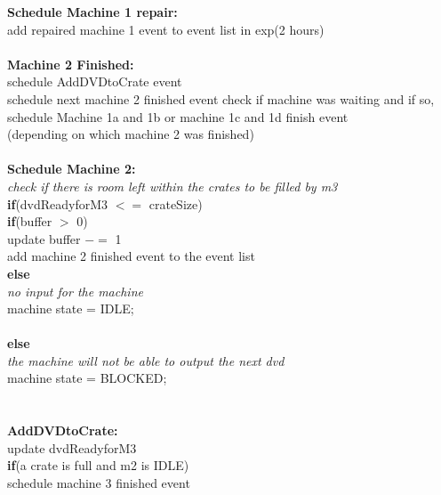 \documentclass[11pt,a4paper]{article}
\newcommand{\tab}{\hspace*{2em}}
\begin{document}
\noindent \textbf{Schedule Machine 1 repair:} \textbraceleft  \\
	\tab add repaired machine 1 event to event list in exp(2 hours) \\
\textbraceright \\

\noindent \textbf{Machine 2 Finished:} \textbraceleft\\ 
	\tab schedule AddDVDtoCrate event \\
	\tab schedule next machine 2 finished event
	\tab check if machine was waiting and if so,
	\tab	schedule Machine 1a and 1b or machine 1c and 1d finish event \\
	\tab	(depending on which machine 2 was finished) \\
\textbraceright \\

\noindent \textbf{Schedule Machine 2:} \textbraceleft\\ 
	\tab \emph{check if there is room left within the crates to be filled by m3}\\
	\tab \textbf{if}(dvdReadyforM3 $<=$ crateSize) \textbraceleft \\
	\tab \tab \textbf{if}(buffer $>$ 0) \textbraceleft \\
	\tab \tab \tab update buffer $ -=$ 1 \\
	\tab \tab \tab add machine 2 finished event to the event list \\
	\tab \tab \textbraceright \textbf{else} \textbraceleft \\
	\tab \tab \tab \emph{no input for the machine} \\
	\tab \tab \tab machine state = IDLE; \\
	\tab \tab \textbraceright \\
	\tab \textbraceright \textbf{else} \textbraceleft \\
	\tab \tab \emph{the machine will not be able to output the next dvd} \\
	\tab \tab machine state = BLOCKED; \\
	\tab  \textbraceright \\
\textbraceright \\

\noindent \textbf{ AddDVDtoCrate: }\textbraceleft\\ 
	\tab update dvdReadyforM3 \\
	\tab \textbf{if}(a crate is full and m2 is IDLE) \textbraceleft \\
	\tab \tab schedule machine 3 finished event \\	
	\tab \textbraceright \\
\textbraceright \\
\end{document}
